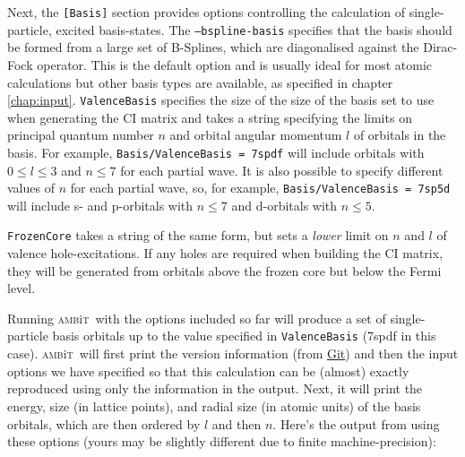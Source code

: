 \documentclass{report}
\newcommand{\ambit}{\textsc{amb}{\footnotesize i}\textsc{t}}
\begin{document}
Next, the \texttt{[Basis]} section provides options controlling the calculation of single-particle, 
excited basis-states. The \texttt{--bspline-basis} specifies that the basis should be formed from a 
large set of B-Splines, which are diagonalised against the Dirac-Fock operator. This is the default
option and is usually ideal for most atomic calculations but other basis types are available, as
specified in chapter \ref{chap:input}. \texttt{ValenceBasis} specifies the size of the size of the basis
set to use when generating the CI matrix and takes a string specifying the limits on principal quantum
number $n$ and orbital angular momentum $l$ of orbitals in the basis. For example, 
\texttt{Basis/ValenceBasis = 7spdf} will include orbitals with $0 \leq l \leq 3$ and $n \leq 7$ for
each partial wave. It is also possible to specify different values of $n$ for each partial wave, so, for
example, \texttt{Basis/ValenceBasis = 7sp5d} will include s- and p-orbitals with $n \leq 7$ and
d-orbitals with $n \leq 5$.

\texttt{FrozenCore} takes a string of the same form, but sets a \emph{lower} limit on $n$ and $l$ of
valence hole-excitations. If any holes are required when building the CI matrix, they will be generated
from orbitals above the frozen core but below the Fermi level.

Running \ambit\  with the options included so far will produce a set of single-particle basis orbitals up
to the value specified in \texttt{ValenceBasis} (7spdf in this case). \ambit\  will first print the 
version information (from \href{https://git-scm.com/}{Git}) and then the input options we have specified
so that this calculation can be (almost) exactly reproduced using only the information in the output.
Next, it will print the energy, size (in lattice points), and radial size (in atomic units) of the basis
orbitals, which are then ordered by $l$ and then $n$. Here's the output from using these options (yours
may be slightly different due to finite machine-precision):
\end{document}
